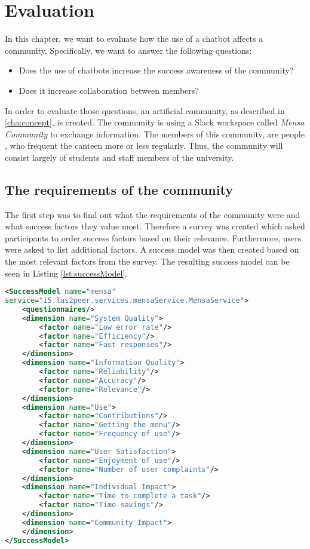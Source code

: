 \chapter{Evaluation}\label{cha:eval}
In this chapter, we want to evaluate how the use of a chatbot affects a community.
Specifically, we want to answer the following questions:
\begin{itemize}
    \item Does the use of chatbots increase the success awareness of the community?
    \item Does it increase collaboration between members?
\end{itemize}

In order to evaluate those questions, an artificial community, as described in \ref{cha:concept}, is created.  
The community is using a Slack workspace called \emph{Mensa Community} to exchange information.
The members of this community, are people , who frequent the canteen more or less regularly.
Thus, the community will consist largely of students and staff members of the university.

\section{The requirements of the community}
The first step was to find out what the requirements of the community were and what success factors they value most.
Therefore a survey was created which asked participants to order success factors based on their relevance. 
Furthermore, users were asked to list additional factors.
A success model was then created based on the most relevant factors from the survey. The resulting success model can be seen in Listing \ref{lst:successModel}.

\begin{lstlisting}[language=XML,caption=Success Model based on requirements, label=lst:successModel]
<SuccessModel name="mensa" 
service="i5.las2peer.services.mensaService.MensaService">
    <questionnaires/>
    <dimension name="System Quality">
        <factor name="Low error rate"/>
        <factor name="Efficiency"/>
        <factor name="Fast responses"/>
    </dimension>
    <dimension name="Information Quality">
        <factor name="Reliability"/>
        <factor name="Accuracy"/>
        <factor name="Relevance"/>
    </dimension>
    <dimension name="Use">
        <factor name="Contributions"/>
        <factor name="Getting the menu"/>
        <factor name="Frequency of use"/>
    </dimension>
    <dimension name="User Satisfaction">
        <factor name="Enjoyment of use"/>
        <factor name="Number of user complaints"/>
    </dimension>
    <dimension name="Individual Impact">
        <factor name="Time to complete a task"/>
        <factor name="Time savings"/>
    </dimension>
    <dimension name="Community Impact">
    </dimension>
</SuccessModel>
\end{lstlisting}

